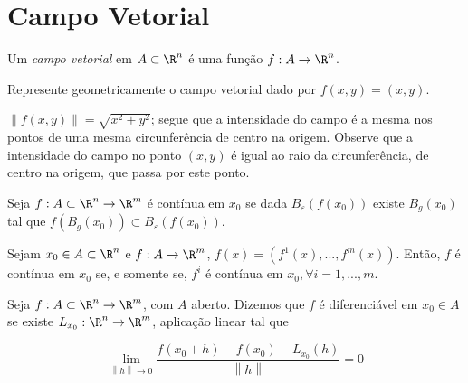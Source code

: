 \documentclass[11pt, oneside, a4paper]{gsm-l}
\begin{document}
\section{Campo Vetorial} \label{sec24}

\begin{defi}
Um \textit{campo vetorial} em $A \subset \R^n$ é uma função $f:A \to \R^n$.
\end{defi}


\begin{exem}
Represente geometricamente o campo vetorial dado por $f(x,y)=(x,y)$.
\end{exem}

\begin{sol}
$\left\| {f\left( {x,y} \right)} \right\| = \sqrt {x^2  + y^2 }$; segue que a intensidade do campo é a mesma nos pontos de uma mesma circunfer\^encia de centro na origem. Observe que a intensidade do campo no ponto $(x,y)$ é igual ao raio da circunfer\^encia, de centro na origem, que passa por este ponto.

\end{sol}

\begin{defi}
Seja $f:A \subset \R^n  \to \R^m$ é contínua em $x_0$ se dada $B_\varepsilon  \left( {f\left( {x_0 } \right)} \right)$ existe $B_g \left( {x_0 } \right)$ tal que $f\left( {B_g \left( {x_0 } \right)} \right) \subset B_\varepsilon  \left( {f\left( {x_0 } \right)} \right)$.
\end{defi}

\begin{teo}
Sejam $x_0 \in A \subset \R^n$ e $f:A \to \R^m$, $f\left( x \right) = \left( {f^1 \left( x \right),...,f^m \left( x \right)} \right)$. Então, $f$ é contínua em $x_0$ se, e somente se, $f^i$ é contínua em $x_0, \forall i = 1,...,m$.
\end{teo}

\begin{defi}
Seja $f:A \subset \R^n  \to \R^m$, com $A$ aberto. Dizemos que $f$ é diferenciável em $x_0 \in A$ se existe $L_{x_0 } :\R^n  \to \R^m$, aplicação linear tal que

\[
\mathop {\lim }\limits_{\left\| h \right\| \to 0} \frac{{f\left( {x_0  + h} \right) - f\left( {x_0 } \right) - L_{x_0 } \left( h \right)}}
{{\left\| h \right\|}} = 0
\]

\end{defi}
\end{document}
